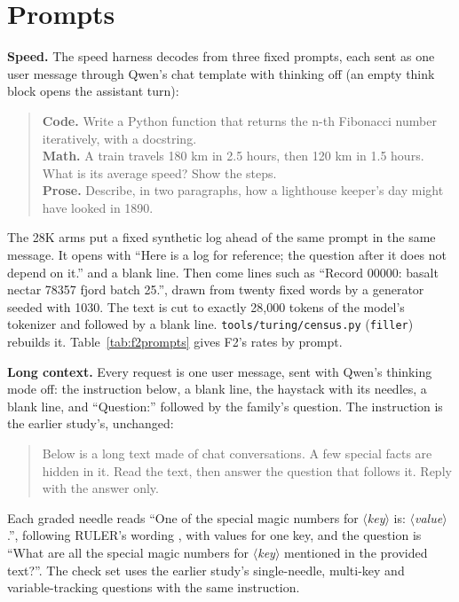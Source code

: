 \documentclass[11pt,letterpaper]{article}
\newcommand{\q}[1]{\texttt{#1}}
\newcommand{\slot}[1]{$\langle$\textit{#1}$\rangle$}
\begin{document}
\clearpage
\section{Prompts}
\label{app:prompts}
\textbf{Speed.} The speed harness decodes from three fixed prompts, each sent
as one user message through Qwen's chat template with thinking off (an empty
think block opens the assistant turn):
\begin{quote}\small
\textbf{Code.} Write a Python function that returns the n-th Fibonacci number
iteratively, with a docstring.\\
\textbf{Math.} A train travels 180 km in 2.5 hours, then 120 km in 1.5 hours.
What is its average speed? Show the steps.\\
\textbf{Prose.} Describe, in two paragraphs, how a lighthouse keeper's day
might have looked in 1890.
\end{quote}
The 28K arms put a fixed synthetic log ahead of the same prompt in the same
message. It opens with ``Here is a log for reference; the question after it
does not depend on it.'' and a blank line. Then come lines such as ``Record
00000: basalt nectar 78357 fjord batch 25.'', drawn from twenty fixed words by
a generator seeded with 1030. The text is cut to exactly 28,000 tokens of the
model's tokenizer and followed by a blank line. \q{tools/turing/census.py}
(\q{filler}) rebuilds it.
Table~\ref{tab:f2prompts} gives F2's rates by prompt.


\textbf{Long context.} Every request is one user message, sent with Qwen's
thinking mode off: the instruction below, a blank line, the haystack with its
needles, a blank line, and ``Question:'' followed by the family's question. The
instruction is the earlier study's, unchanged:
\begin{quote}\small
Below is a long text made of chat conversations. A few special facts are
hidden in it. Read the text, then answer the question that follows it. Reply
with the answer only.
\end{quote}
Each graded needle reads ``One of the special magic numbers for \slot{key}
is: \slot{value}.'', following RULER's wording \citep{hsieh2024ruler}, with
\PeNeedles{} values for one key, and the question is ``What are all the
special magic numbers for \slot{key} mentioned in the provided text?''. The
check set uses the earlier study's single-needle, multi-key and
variable-tracking questions with the same instruction.
\end{document}
